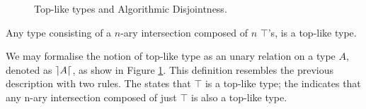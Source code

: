 \begin{figure}[h]


  \caption{Top-like types and Algorithmic Disjointness.}
  \label{fig:tltypesdis}
\end{figure}

\begin{definition}
  Any type consisting of a $n$-ary intersection composed of $n$ $\top$'s, is a top-like type. 
\end{definition}

We may formalise the notion of top-like type as an unary relation on a type $A$, denoted as $\rceil A \lceil$, as show in 
Figure \ref{fig:tltypesdis}.
This definition resembles the previous description with two rules.
The  states that $\top$ is a top-like type; 
the  indicates that any n-ary intersection composed of just $\top$ is also a top-like type.





